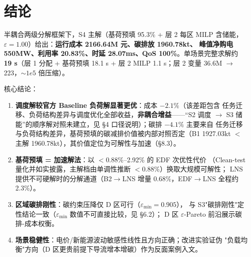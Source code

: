 \documentclass{internal-report}
\begin{document}
\section{结论}

半耦合两级分解框架下，S4 主解（基荷预填 95.3\% + 层 2 每区 MILP 含储能，
$\varepsilon{=}1.00$）给出：\textbf{运行成本 2166.64M 元、碳排放 1960.78kt、
峰值净购电 550MW、利用率 20.83\%、时延 28.07ms、QoS 100\%}。单场景完整求解约
\textbf{19 s}（层 1 分配 + 基荷预填 18.1 s + 层 2 MILP 1.1 s；层 2 变量
36.6M $\to$ 223，$\sim 1e5$ 倍压缩）。

核心结论：
\begin{enumerate}
  \item \textbf{调度解较官方 Baseline 负荷解显著更优}：成本 $-2.1\%$（该差距包含
        任务迁移、负荷结构差异与调度优化全部收益，\textbf{非耦合增益}——``S2 调度
        $\to$ S3 储能''的顺序解对照未建立，见 §4 口径说明）；碳排 $-4.1\%$ 主要来自
        任务迁移与负荷结构差异，基荷预填的碳减排价值被内部对照否定（B1 1927.03kt
        $<$ 主解 1960.78kt），其价值定位为可解性与加速（§8.3）。
  \item \textbf{基荷预填 = 加速解法}：以 $<0.88\%$--2.92\% 的 EDF 次优性代价
        （Clean-test 量化并如实披露，主解档由单调性推断 $<0.88\%$）换取大规模可解性；
        LNS 提供不可硬解时的分解通道（B2$\to$LNS 增量 0.68\%，EDF$\to$LNS 全程约 2.3\%）。
  \item \textbf{区域碳排刚性}：碳约束压降仅 D 区可行（$\varepsilon_{\min}{=}0.905$），
        与 S3"碳排刚性"定性结论一致（$\varepsilon_{\min}$ 数值不可直接比较，见 §6.2）；
        D 区 $\varepsilon$-Pareto 前沿展示碳排-成本权衡。
  \item \textbf{场景稳健性}：电价/新能源波动敏感性线性且方向正确；改进实验证伪
        "负载均衡"方向（D 区更贵前提下导流增本增碳）作为反面案例入文。
\end{enumerate}
\end{document}
